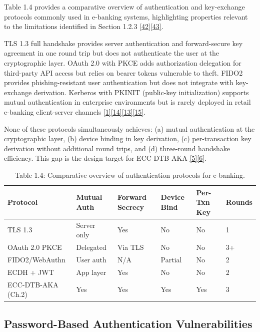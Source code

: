 \indent Table 1.4 provides a comparative overview of authentication and key-exchange protocols commonly used in e-banking systems, highlighting properties relevant to the limitations identified in Section 1.2.3 \hyperref[ref:42]{[42]}\hyperref[ref:43]{[43]}.

\indent TLS 1.3 full handshake provides server authentication and forward-secure key agreement in one round trip but does not authenticate the user at the cryptographic layer. OAuth 2.0 with PKCE adds authorization delegation for third-party API access but relies on bearer tokens vulnerable to theft. FIDO2 provides phishing-resistant user authentication but does not integrate with key-exchange derivation. Kerberos with PKINIT (public-key initialization) supports mutual authentication in enterprise environments but is rarely deployed in retail e-banking client-server channels \hyperref[ref:1]{[1]}\hyperref[ref:14]{[14]}\hyperref[ref:13]{[13]}\hyperref[ref:15]{[15]}.

\indent None of these protocols simultaneously achieves: (a) mutual authentication at the cryptographic layer, (b) device binding in key derivation, (c) per-transaction key derivation without additional round trips, and (d) three-round handshake efficiency. This gap is the design target for ECC-DTB-AKA \hyperref[ref:5]{[5]}\hyperref[ref:6]{[6]}.

\begin{table}[htbp]
\centering
\begin{tabular}{llllll}
\toprule
Protocol & Mutual Auth & Forward Secrecy & Device Bind & Per-Txn Key & Rounds \\
\midrule
TLS 1.3 & Server only & Yes & No & No & 1 \\
OAuth 2.0 PKCE & Delegated & Via TLS & No & No & 3+ \\
FIDO2/WebAuthn & User auth & N/A & Partial & No & 2 \\
ECDH + JWT & App layer & Yes & No & No & 2 \\
ECC-DTB-AKA (Ch.2) & Yes & Yes & Yes & Yes & 3 \\
\bottomrule
\end{tabular}
\caption{Table 1.4: Comparative overview of authentication protocols for e-banking.}\label{tbl:1.4}
\end{table}
\subsection{Password-Based Authentication Vulnerabilities}

